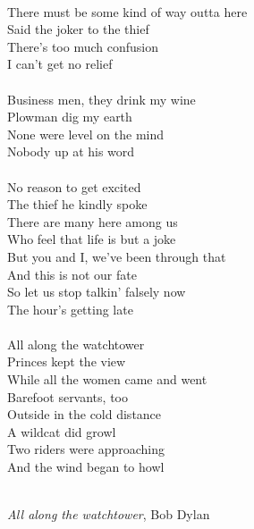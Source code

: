 \documentclass[11pt, english, singlespacing, headsepline, ]{MastersDoctoralThesis}
\theoremstyle{definition}
\begin{document}
\cleardoublepage
 $\mbox{}$\\
There must be some kind of way outta here\\
Said the joker to the thief\\
There's too much confusion\\
I can't get no relief\\
\\
Business men, they drink my wine\\
Plowman dig my earth\\
None were level on the mind\\
Nobody up at his word\\
\\
No reason to get excited\\
The thief he kindly spoke\\
There are many here among us\\
Who feel that life is but a joke\\
But you and I, we've been through that\\
And this is not our fate\\
So let us stop talkin' falsely now\\
The hour's getting late\\
\\
All along the watchtower\\
Princes kept the view\\
While all the women came and went\\
Barefoot servants, too\\
Outside in the cold distance\\
A wildcat did growl\\
Two riders were approaching\\
And the wind began to howl\\
\\
\begin{flushright}
\textit{All along the watchtower}, Bob Dylan
\end{flushright}




\end{document}
